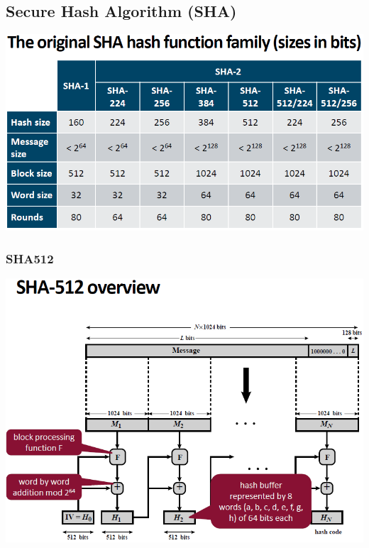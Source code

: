 \documentclass[12pt]{article}
\begin{document}
 \subsection{Secure Hash Algorithm (SHA)}
 \includegraphics[width=0.8\linewidth]{./slides/L3P2SHA.PNG}
 \subsubsection{SHA512}
 \includegraphics[width=\linewidth]{./slides/L3P2SHA512.PNG}
\end{document}
